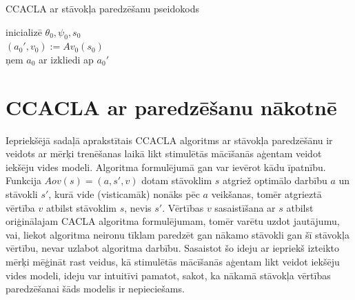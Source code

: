 \documentclass{ludis} %
\begin{document}
\begin{spacing}{1}
\begin{algorithm}
\caption{CCACLA ar stāvokļa paredzēšanu pseidokods}\label{alg:ccacla-state}
inicializē $\theta_0, \psi_0, s_0$ \\
$(a_0', v_0) := Av_0(s_0)$ \\
ņem $a_0$ ar izkliedi ap $a_0'$ \\
\end{algorithm}
\end{spacing}

\section{CCACLA ar paredzēšanu nākotnē}
Iepriekšējā sadaļā aprakstītais CCACLA algoritms ar stāvokļa paredzēšānu ir
veidots ar mērķi trenēšanas laikā likt stimulētās mācīšanās aģentam veidot
iekšēju vides modeli. Algoritma formulējumā gan var ievērot kādu īpatnību.
Funkcija $Aov(s) = (a, s', v)$ dotam stāvoklim $s$ atgriež optimālo darbību $a$
un stāvokli $s'$, kurā vide (visticamāk) nonāks pēc $a$ veikšanas, tomēr
atgrieztā vērtība $v$ atbilst stāvoklim $s$, nevis $s'$. Vērtības $v$
sasaistīšana ar $s$ atbilst oriģinālajam CACLA algoritma formulējumam, tomēr
varētu uzdot jautājumu, vai, liekot algoritma neironu tīklam paredzēt gan nākamo
stāvokli gan šī stāvokļa vērtību, nevar uzlabot algoritma darbību. Sasaistot šo
ideju ar iepriekš izteikto mērķi mēģināt rast veidus, kā stimulētās mācīšanās
aģentam likt veidot iekšēju vides modeli, ideju var intuitīvi pamatot, sakot, ka
nākamā stāvokļa vērtības paredzēšanai šāds modelis ir nepieciešams.
\end{document}
